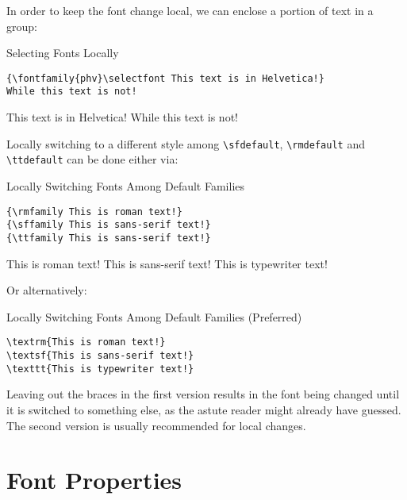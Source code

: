 \documentclass[a4paper,oneside,11pt]{article}
\newcommand\comm[1]{\texttt{\textbackslash#1}}
\begin{document}
In order to keep the font change local,  we can enclose a portion of text in a
group:

\begin{titled-frame}
{\textsf{Selecting Fonts Locally}}
\vspace{-1em}
\begin{verbatim}
{\fontfamily{phv}\selectfont This text is in Helvetica!}
While this text is not!
\end{verbatim}
{\selectfont This text is in Helvetica!} While this text is not!
\end{titled-frame}

Locally   switching    to   a   different   style    among   \comm{sfdefault},
\comm{rmdefault} and \comm{ttdefault} can be done either via:

\begin{titled-frame}
{\textsf{Locally Switching Fonts Among Default Families}}
\vspace{-1em}
\begin{verbatim}
{\rmfamily This is roman text!}
{\sffamily This is sans-serif text!}
{\ttfamily This is sans-serif text!}
\end{verbatim}
{\rmfamily This is roman text!}
{\sffamily This is sans-serif text!}
{\ttfamily This is typewriter text!}
\end{titled-frame}

Or alternatively:

\begin{titled-frame}
{\textsf{Locally Switching Fonts Among Default Families (Preferred)}}
\vspace{-1em}
\begin{verbatim}
\textrm{This is roman text!}
\textsf{This is sans-serif text!}
\texttt{This is typewriter text!}
\end{verbatim}
\vspace{-1em}
\end{titled-frame}

Leaving out the braces in the first  version results in the font being changed
until it  is switched to  something else, as  the astute reader  might already
have guessed. The second version is usually recommended for local changes.


\section{Font Properties}
\label{sec:font-props}
\end{document}
